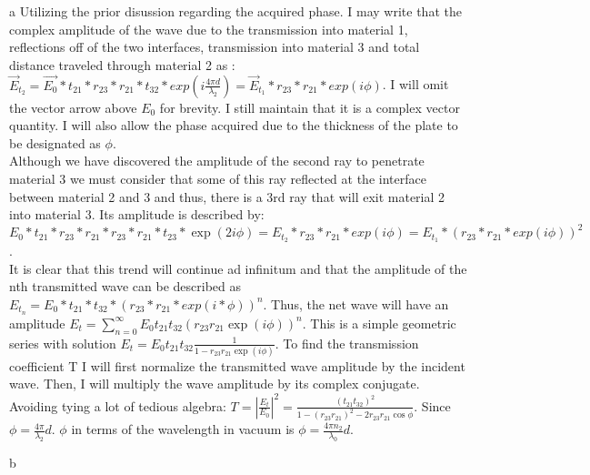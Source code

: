 \begin{homeworkProblem}
\begin{homeworkSection}{a}
Utilizing the prior disussion regarding the acquired phase. I may write that the complex amplitude of the wave due to the transmission into material 1, reflections off of the two interfaces, transmission into material 3 and total distance traveled through material 2 as : $\vec{E}_{t_2} = \vec{E_0}*t_{21}*r_{23}*r_{21}*t_{32}*exp(i\frac{4\pi d}{\lambda_2}) = \vec{E}_{t_1}*r_{23}*r_{21}*exp(i\phi)$. I will omit the vector arrow above $E_0$ for brevity. I still maintain that it is a complex vector quantity. I will also allow the phase acquired due to the thickness of the plate to be designated as $\phi$. 
\\

Although we have discovered the amplitude of the second ray to penetrate material 3 we must consider that some of this ray reflected at the interface between material 2 and 3 and thus, there is a 3rd ray that will exit material 2 into material 3. Its amplitude is described by: $E_0*t_{21}*r_{23}*r_{21}*r_{23}*r_{21}*t_{23}*\exp(2 i\phi) = E_{t_2}*r_{23}*r_{21}*exp(i\phi) = E_{t_1}* (r_{23}*r_{21}*exp(i\phi))^2$.
\\

It is clear that this trend will continue ad infinitum and that the amplitude of the nth transmitted wave can be described as $E_{t_n} = E_0*t_{21}*t_{32}*(r_{23}*r_{21}*exp(i*\phi))^n$. Thus, the net wave will have an amplitude $E_t = \sum\limits_{n=0}^\infty E_0 t_{21} t_{32} (r_{23}r_{21}\exp(i\phi))^n$. This is a simple geometric series with solution $E_t = E_0 t_{21} t_{32} \frac{1}{1-r_{23}r_{21}\exp(i\phi)}$. To find the transmission coefficient T I will first normalize the transmitted wave amplitude by the incident wave. Then, I will multiply the wave amplitude by its complex conjugate. Avoiding tying a lot of tedious algebra: $T = |\frac{E_t}{E_0}|^2 = \frac{(t_{21}t_{32})^2}{1-(r_{23}r_{21})^2-2 r_{23} r_{21} \cos\phi }$. Since $\phi = \frac{4\pi}{\lambda_2}d$. $\phi$ in terms of the wavelength in vacuum is $\phi = \frac{4\pi n_2}{\lambda_0}d$.

\end{homeworkSection}

\begin{homeworkSection}{b}

\end{homeworkSection}
\end{homeworkProblem}
